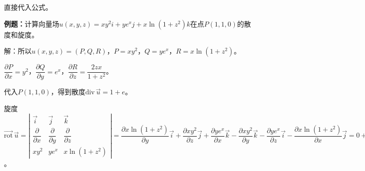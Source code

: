 \documentclass[UTF8, 12pt]{ctexart}
\begin{document}
直接代入公式。

\textbf{例题：}计算向量场$u(x,y,z)=xy^2i+ye^xj+x\ln(1+z^2)k$在点$P(1,1,0)$的散度和旋度。

解：所以$u(x,y,z)=(P,Q,R)$，$P=xy^2$，$Q=ye^x$，$R=x\ln(1+z^2)$。

$\dfrac{\partial P}{\partial x}=y^2$，$\dfrac{\partial Q}{\partial y}=e^x$，$\dfrac{\partial R}{\partial z}=\dfrac{2zx}{1+z^2}$。

代入$P(1,1,0)$，得到散度$\textrm{div}\,\vec{u}=1+e$。

旋度$\overrightarrow{\textrm{rot}}\,\vec{u}=\left\vert\begin{array}{ccc}
    \vec{i} & \vec{j} & \vec{k} \\
    \dfrac{\partial}{\partial x} & \dfrac{\partial}{\partial y} & \dfrac{\partial}{\partial z} \\
    xy^2 & ye^x & x\ln(1+z^2)
\end{array}\right\vert=\dfrac{\partial x\ln(1+z^2)}{\partial y}\vec{i}+\dfrac{\partial xy^2}{\partial z}\vec{j}+\dfrac{\partial ye^x}{\partial x}\vec{k}-\dfrac{\partial xy^2}{\partial y}\vec{k}-\dfrac{\partial ye^x}{\partial z}\vec{i}-\dfrac{\partial x\ln(1+z^2)}{\partial x}\vec{j}=0+0+ye^x\vec{k}-2xy\vec{k}-0-\ln(1+z^2)\vec{j}=-\ln(1+z^2)\vec{j}+(ye^x-2xy)\vec{k}=(0,0,e-2)$。
\end{document}
